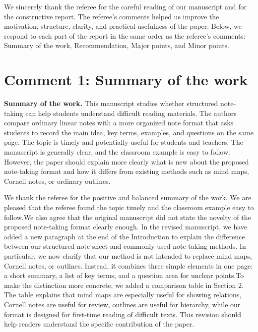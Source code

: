 We sincerely thank the referee for the careful reading of our manuscript and for the constructive report. The referee's comments helped us improve the motivation, structure, clarity, and practical usefulness of the paper. Below, we respond to each part of the report in the same order as the referee's comments: Summary of the work, Recommendation, Major points, and Minor points.
\section*{Comment 1: Summary of the work}
\begin{commentbox}
\textbf{Summary of the work.} This manuscript studies whether structured note-taking can help students understand difficult reading materials. The authors compare ordinary linear notes with a more organized note format that asks students to record the main idea, key terms, examples, and questions on the same page. The topic is timely and potentially useful for students and teachers. The manuscript is generally clear, and the classroom example is easy to follow. However, the paper should explain more clearly what is new about the proposed note-taking format and how it differs from existing methods such as mind maps, Cornell notes, or ordinary outlines.
\end{commentbox}
\begin{replybox}
We thank the referee for the positive and balanced summary of the work. We are pleased that the referee found the topic timely and the classroom example easy to follow.We also agree that the original manuscript did not state the novelty of the proposed note-taking format clearly enough. In the revised manuscript, we have added a new paragraph at the end of the Introduction to explain the difference between our structured note sheet and commonly used note-taking methods. In particular, we now clarify that our method is not intended to replace mind maps, Cornell notes, or outlines. Instead, it combines three simple elements in one page: a short summary, a list of key terms, and a question area for unclear points.To make the distinction more concrete, we added a comparison table in Section 2. The table explains that mind maps are especially useful for showing relations, Cornell notes are useful for review, outlines are useful for hierarchy, while our format is designed for first-time reading of difficult texts. This revision should help readers understand the specific contribution of the paper.
\end{replybox}
